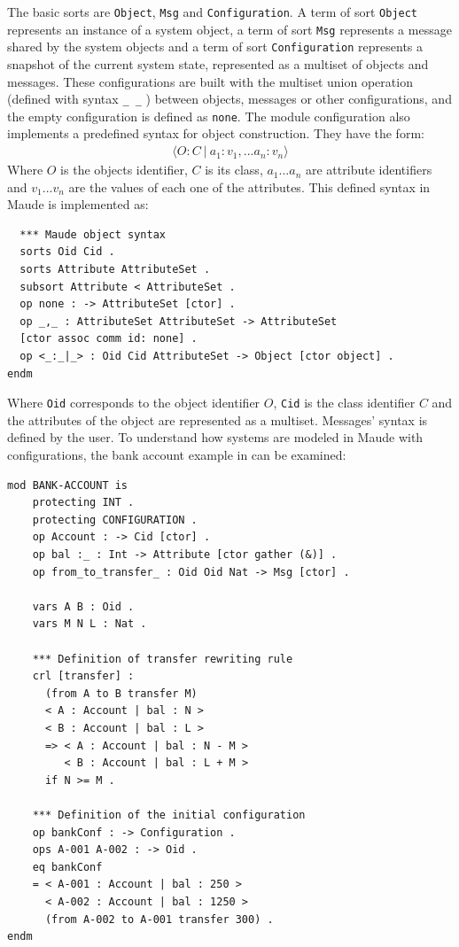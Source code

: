 The basic sorts are \texttt{Object}, \texttt{Msg} and \texttt{Configuration}. A term of sort \texttt{Object} represents an instance of a system object, a term of sort \texttt{Msg} represents a message shared by the system objects and a term of sort \texttt{Configuration} represents a snapshot of the current system state, represented as a multiset of objects and messages. These configurations are built with the multiset union operation (defined with syntax \texttt{\_\,\_} ) between objects, messages or other configurations, and the empty configuration is defined as \texttt{none}. The module configuration also implements a predefined syntax for object construction. They have the form:
\begin{align*}
    \langle O : C \ | \ a_1:v_1,...a_n:v_n \rangle
\end{align*}
Where $O$ is the objects identifier, $C$ is its class, $a_1...a_n$ are attribute identifiers and $v_1...v_n$ are the values of each one of the attributes. This defined syntax in Maude is implemented as:
\begin{lstlisting}
  *** Maude object syntax
  sorts Oid Cid .
  sorts Attribute AttributeSet .
  subsort Attribute < AttributeSet .
  op none : -> AttributeSet [ctor] .
  op _,_ : AttributeSet AttributeSet -> AttributeSet
  [ctor assoc comm id: none] .
  op <_:_|_> : Oid Cid AttributeSet -> Object [ctor object] .
endm
\end{lstlisting}
Where \texttt{Oid} corresponds to the object identifier $O$, \texttt{Cid} is the class identifier $C$ and the attributes of the object are represented as a multiset. Messages' syntax is defined by the user. To understand how systems are modeled in Maude with configurations, the bank account example in \cite{MaudeManual} can be examined:
\begin{lstlisting}
mod BANK-ACCOUNT is
    protecting INT .
    protecting CONFIGURATION .
    op Account : -> Cid [ctor] .
    op bal :_ : Int -> Attribute [ctor gather (&)] .
    op from_to_transfer_ : Oid Oid Nat -> Msg [ctor] .
    
    vars A B : Oid .
    vars M N L : Nat .

    *** Definition of transfer rewriting rule
    crl [transfer] :
      (from A to B transfer M)
      < A : Account | bal : N >
      < B : Account | bal : L >
      => < A : Account | bal : N - M >
         < B : Account | bal : L + M >
      if N >= M .

    *** Definition of the initial configuration
    op bankConf : -> Configuration .
    ops A-001 A-002 : -> Oid .
    eq bankConf
    = < A-001 : Account | bal : 250 >
      < A-002 : Account | bal : 1250 >
      (from A-002 to A-001 transfer 300) .
endm
\end{lstlisting}

